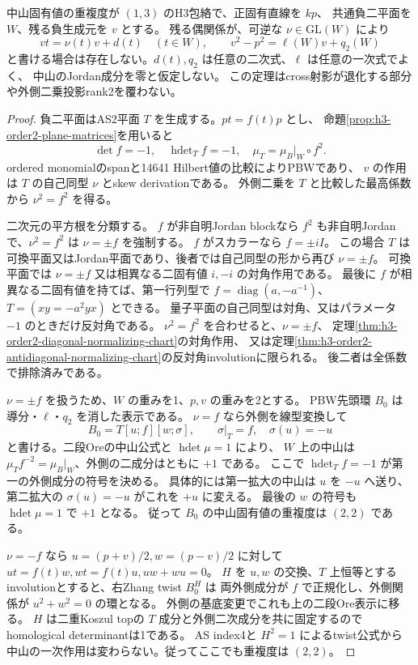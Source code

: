 \begin{theorem}
\label{thm:h3-order2-full-normalizing-chart}
中山固有値の重複度が $(1,3)$ のH3包絡で、正固有直線を $kp$、
共通負二平面を $W$、残る負生成元を $v$ とする。
残る偶関係が、可逆な $\nu\in\mathrm{GL}(W)$ により
\[
 vt=\nu(t)v+d(t)\quad(t\in W),\qquad
 v^2-p^2=\ell(W)v+q_2(W)
\]
と書ける場合は存在しない。$d(t),q_2$ は任意の二次式、$\ell$ は任意の一次式でよく、
中山のJordan成分を零と仮定しない。
この定理はcross射影が退化する部分や外側二乗投影rank2を覆わない。
\end{theorem}
\begin{proof}
負二平面はAS2平面 $T$ を生成する。$pt=f(t)p$ とし、
命題\ref{prop:h3-order2-plane-matrices}を用いると
\[
 \det f=-1,\quad \operatorname{hdet}_T f=-1,\quad
 \mu_T=\mu_B|_W\circ f^2.
\]
ordered monomialのspanと14641 Hilbert値の比較によりPBWであり、
$v$ の作用は $T$ の自己同型 $\nu$ とskew derivationである。
外側二乗を $T$ と比較した最高係数から $\nu^2=f^2$ を得る。

二次元の平方根を分類する。
$f$ が非自明Jordan blockなら $f^2$ も非自明Jordanで、$\nu^2=f^2$ は $\nu=\pm f$ を強制する。
$f$ がスカラーなら $f=\pm iI$。
この場合 $T$ は可換平面又はJordan平面であり、後者では自己同型の形から再び $\nu=\pm f$。
可換平面では $\nu=\pm f$ 又は相異なる二固有値 $i,-i$ の対角作用である。
最後に $f$ が相異なる二固有値を持てば、第一行列型で
$f=\operatorname{diag}(a,-a^{-1})$、$T=(xy=-a^2yx)$ とできる。
量子平面の自己同型は対角、又はパラメータ $-1$ のときだけ反対角である。
$\nu^2=f^2$ を合わせると、$\nu=\pm f$、
定理\ref{thm:h3-order2-diagonal-normalizing-chart}の対角作用、
又は定理\ref{thm:h3-order2-antidiagonal-normalizing-chart}の反対角involutionに限られる。
後二者は全係数で排除済みである。

$\nu=\pm f$ を扱うため、$W$ の重みを1、$p,v$ の重みを2とする。
PBW先頭環 $B_0$ は導分・$\ell$・$q_2$ を消した表示である。
$\nu=f$ なら外側を線型変換して
\[
 B_0=T[u;f][w;\sigma],\qquad \sigma|_T=f,\quad\sigma(u)=-u
\]
と書ける。二段Oreの中山公式と $\operatorname{hdet}\mu=1$ により、
$W$ 上の中山は $\mu_T f^{-2}=\mu_B|_W$、外側の二成分はともに $+1$ である。
ここで $\operatorname{hdet}_T f=-1$ が第一の外側成分の符号を決める。
具体的には第一拡大の中山は $u$ を $-u$ へ送り、第二拡大の $\sigma(u)=-u$ がこれを $+u$ に変える。
最後の $w$ の符号も $\operatorname{hdet}\mu=1$ で $+1$ となる。
従って $B_0$ の中山固有値の重複度は $(2,2)$ である。

$\nu=-f$ なら $u=(p+v)/2,w=(p-v)/2$ に対して
$ut=f(t)w,wt=f(t)u,uw+wu=0$。
$H$ を $u,w$ の交換、$T$ 上恒等とするinvolutionとすると、右Zhang twist $B_0^H$ は
両外側成分が $f$ で正規化し、外側関係が $u^2+w^2=0$ の環となる。
外側の基底変更でこれも上の二段Ore表示に移る。
$H$ は二重Koszul topの $T$ 成分と外側二次成分を共に固定するのでhomological determinantは1である。
AS index4と $H^2=1$ によるtwist公式\cite[Theorem 0.3]{RRZ}から
中山の一次作用は変わらない。従ってここでも重複度は $(2,2)$。


\end{proof}
